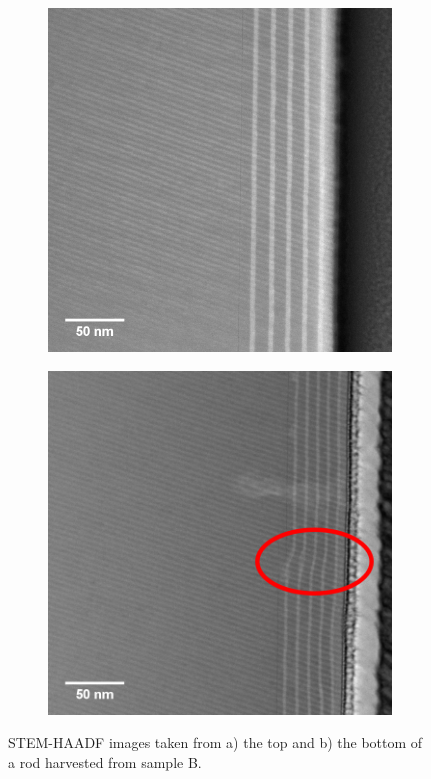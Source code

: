 \begin{figure}[!h]
	\begin{subfigure}[b]{0.45\textwidth}
		\centering
		\includegraphics[width=1\linewidth]{Figs/Ch6/Bstem1}
		\caption{}
		
	\end{subfigure}%
	\hspace*{1.3cm}
	\begin{subfigure}[b]{0.45\textwidth}
		\centering
		\includegraphics[width=1\linewidth]{Figs/Ch6/Bstembot}
		\caption{}
	\end{subfigure}%
	
	\caption{STEM-HAADF images taken from a) the top and b) the bottom of a rod harvested from sample B. }
	\label{Btopbot}
\end{figure}
\FloatBarrier

